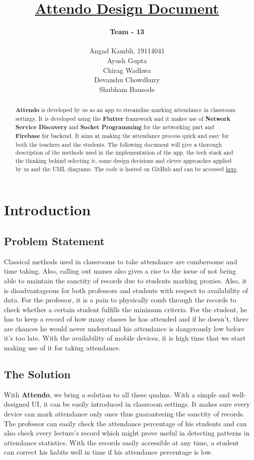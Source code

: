 \documentclass{article}
\title{\textbf{\underline{Attendo Design Document}}}
\author{
\textbf{Team - 13} \\
\\ Angad Kambli, 19114041\\ 
Ayush Gupta \\ 
Chirag Wadhwa \\ 
Devanshu Chowdhury \\ 
Shubham Bansode \\ }
\date{}
\begin{document}
\maketitle

\begin{abstract}
    \textbf{Attendo} is developed by us as an app to streamline marking attendance in classroom settings. It is developed using the \textbf{Flutter} framework and it makes use of \textbf{Network Service Discovery} and \textbf{Socket Programming} for the networking part and \textbf{Firebase} for backend. It aims at making the attendance process quick and easy for both the teachers and the students. The following document will give a thorough description of the methods used in the implementation of the app, the tech stack and the thinking behind selecting it, some design decisions and clever approaches applied by us and the UML diagrams. The code is hosted on GitHub and can be accessed \href{https://github.com/Attendo-App/Attendo}{here}.
\end{abstract}
\tableofcontents
\newpage

\section{Introduction}
\subsection{Problem Statement}
Classical methods used in classrooms to take attendance are cumbersome and time taking. Also, calling out names also gives a rise to the issue of not being able to maintain the sanctity of records due to students marking proxies. Also, it is disadvantageous for both professors and students with respect to availability of data. For the professor, it is a pain to physically comb through the records to check whether a certain student fulfills the minimum criteria. For the student, he has to keep a record of how many classes he has attended and if he doesn't, there are chances he would never understand his attendance is dangerously low before it's too late. With the availability of mobile devices, it is high time that we start making use of it for taking attendance.
\subsection{The Solution}
With \textbf{Attendo}, we bring a solution to all these qualms. With a simple and well-designed UI, it can be easily introduced in classroom settings. It makes sure every device can mark attendance only once thus guaranteeing the sanctity of records. The professor can easily check the attendance percentage of his students and can also check every lecture's record which might prove useful in detecting patterns in attendance statistics. With the records easily accessible at any time, a student can correct his habits well in time if his attendance percentage is low.
\end{document}
